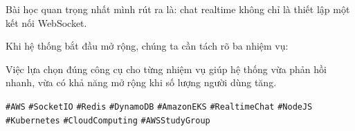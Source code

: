 Bài học quan trọng nhất mình rút ra là: chat realtime không chỉ là thiết
lập một kết nối WebSocket.

Khi hệ thống bắt đầu mở rộng, chúng ta cần tách rõ ba nhiệm vụ:

\begin{Shaded}
\begin{Highlighting}[]


\end{Highlighting}
\end{Shaded}

Việc lựa chọn đúng công cụ cho từng nhiệm vụ giúp hệ thống vừa phản hồi
nhanh, vừa có khả năng mở rộng khi số lượng người dùng tăng.

\texttt{\#AWS} \texttt{\#SocketIO} \texttt{\#Redis} \texttt{\#DynamoDB}
\texttt{\#AmazonEKS} \texttt{\#RealtimeChat} \texttt{\#NodeJS}
\texttt{\#Kubernetes} \texttt{\#CloudComputing} \texttt{\#AWSStudyGroup}
